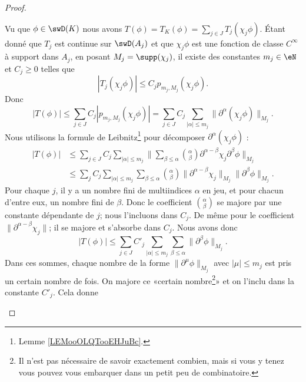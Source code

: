 \begin{proof}
\begin{subproof}
        Vu que \( \phi\in \swD(K)\) nous avons \( T(\phi)=T_K(\phi)=\sum_{j\in J}T_j(\chi_j\phi)\). Étant donné que \( T_j\) est continue sur \( \swD(A_j)\) et que \( \chi_j\phi\) est une fonction de classe \(  C^{\infty}\) à support dans \( A_j\), en posant \( M_j=\supp(\chi_j)\), il existe des constantes \( m_j\in \eN\) et \( C_j\geq 0\) telles que
        \begin{equation}
            | T_j(\chi_j\phi) |\leq C_jp_{m_j,M_j}(\chi_j\phi).
        \end{equation}
        Donc
        \begin{equation}
            | T(\phi) |\leq \sum_{j\in J}C_j| p_{m_j,M_j}(\chi_j\phi) |=\sum_{j\in J}C_j\sum_{| \alpha |\leq m_j}\| \partial^{\alpha}(\chi_j\phi) \|_{M_j}.
        \end{equation}
        Nous utilisons la formule de Leibnitz\footnote{Lemme \ref{LEMooOLQTooEHJuBc}.} pour décomposer \( \partial^{\alpha}(\chi_j\phi)\) :
        \begin{subequations}
            \begin{align}
            | T(\phi) |&\leq\sum_{j\in J}C_j\sum_{| \alpha |\leq m_j}\| \sum_{\beta\leq \alpha}\binom{ \alpha }{ \beta }\partial^{\alpha-\beta}\chi_j\partial^{\beta}\phi \|_{M_j}\\
            &\leq \sum_jC_j\sum_{| \alpha |\leq m_j}\sum_{\beta\leq \alpha}\binom{ \alpha }{ \beta }\| \partial^{\alpha-\beta}\chi_j \|_{M_j}\| \partial^{\beta}\phi \|_{M_j}.
            \end{align}
        \end{subequations}
        Pour chaque \( j\), il y a un nombre fini de multiindices \( \alpha\) en jeu, et pour chacun d'entre eux, un nombre fini de \( \beta\). Donc le coefficient \( \binom{ \alpha }{ \beta }\) se majore par une constante dépendante de \( j\); nous l'incluons dans \( C_j\). De même pour le coefficient \( \| \partial^{\alpha-\beta}\chi_j \|\); il se majore et s'absorbe dans \( C_j\). Nous avons donc
        \begin{equation}
            | T(\phi) |\leq \sum_{j\in J}C'_j\sum_{| \alpha |\leq m_j}\sum_{\beta\leq \alpha}\| \partial^{\beta}\phi \|_{M_j}.
        \end{equation}
        Dans ces sommes, chaque nombre de la forme \( \| \partial^{\mu}\phi \|_{M_j}\) avec \( | \mu |\leq m_j\) est pris un certain nombre de fois. On majore ce «certain nombre\footnote{Il n'est pas nécessaire de savoir exactement combien, mais si vous y tenez vous pouvez vous embarquer dans un petit peu de combinatoire.}» et on l'inclu dans la constante \( C'_j\). Cela donne

\end{subproof}
\end{proof}
